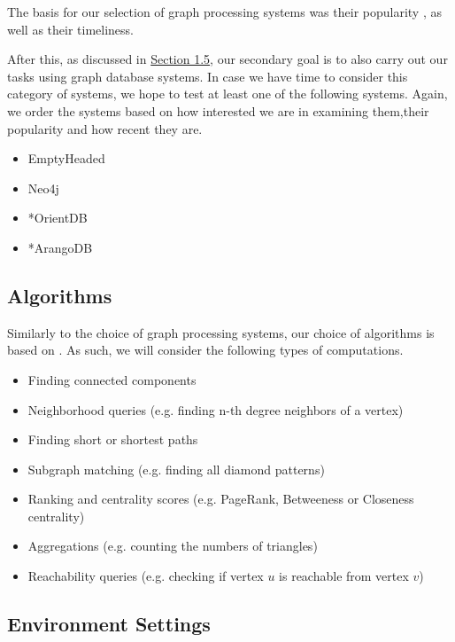 \documentclass[a4paper,11pt]{article}
\begin{document}
\par The basis for our selection of graph processing systems was their popularity \cite{survey}, as well as their timeliness.

\par After this, as discussed in \hyperref[feasibility]{Section 1.5}, our secondary goal is to also carry out our tasks using graph database systems. In case we have time to consider this category of systems, we hope to test at least one of the following systems. Again, we order the systems based on how interested we are in examining them,their popularity and how recent they are.

\begin{itemize}

	\item EmptyHeaded \cite{emptyheaded,emptyheadedgit}
	\item Neo4j \cite{neo4j}
	\item *OrientDB \cite{orientdb}
	\item *ArangoDB \cite{arangodb}

\end{itemize}

\subsection{Algorithms} \label{algos}

\par Similarly to the choice of graph processing systems, our choice of algorithms is based on  \cite{survey}. As such, we will consider the following types of computations.

\begin{itemize}
	\item Finding connected components
	\item Neighborhood queries (e.g. finding n-th degree neighbors of a vertex)
	\item Finding short or shortest paths
	\item Subgraph matching (e.g. finding all diamond patterns)
	\item Ranking and centrality scores (e.g. PageRank, Betweeness or Closeness centrality)
	\item Aggregations (e.g. counting the numbers of triangles)
	\item Reachability queries (e.g. checking if vertex $u$ is reachable from vertex $v$)
\end{itemize}

\subsection{Environment Settings}
\end{document}
